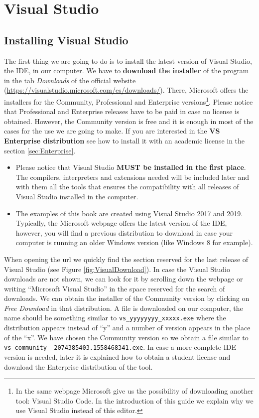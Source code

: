 \chapter{Visual Studio} \label{ch:VS}

    \FloatBarrier
    \section{Installing Visual Studio}

The first thing we are going to do is to install the latest version of Visual Studio, the IDE, in our computer. We have to \textbf{download the installer} of the program in the tab \textit{Downloads} of the official website (\url{https://visualstudio.microsoft.com/es/downloads/}). There, Microsoft offers the installers for the Community, Professional and Enterprise versions\footnote{In the same webpage Microsoft give us the possibility of downloading another tool: Visual Studio Code. In the introduction of this guide we explain why we use Visual Studio instead of this editor.}. Please notice that Professional and Enterprise releases have to be paid in case no license is obtained. However, the Community version is free and it is enough in most of the cases for the use we are going to make. If you are interested in the \textbf{VS Enterprise distribution} see how to install it with an academic license in the section \ref{sec:Enterprise}.

\begin{IN}
    \begin{itemize}
        \item Please notice that Visual Studio \textbf{MUST be installed in the first place}. The compilers, interpreters and extensions needed will be included later and with them all the tools that ensures the compatibility with all releases of Visual Studio installed in the computer.
        \item The examples of this book are created using Visual Studio 2017 and 2019. Typically, the Microsoft webpage offers the latest version of the IDE, however, you will find a previous distribution to download in case your computer is running an older Windows version (like Windows 8 for example).
    \end{itemize}
\end{IN}

When opening the url we quickly find the section reserved for the last release of Visual Studio (see Figure \ref{fig:VisualDownload}). In case the Visual Studio downloads are not shown, we can look for it by scrolling down the webpage or writing ``Microsoft Visual Studio'' in the space reserved for the search of downloads. We can obtain the installer of the Community version by clicking on \textit{Free Download }in that distribution.  A file is downloaded on our computer, the name should be something similar to \texttt{vs\_yyyyyyyy\_xxxxx.exe} where the distribution appears instead of ``y'' and a number of version appears in the place of the ``x''. We have chosen the Community version so we obtain a file similar to \texttt{vs\_community\_\_2074385403.1558468341.exe}. In case a more complete IDE version is needed, later it is explained how to obtain a student license and download the Enterprise distribution of the tool.

